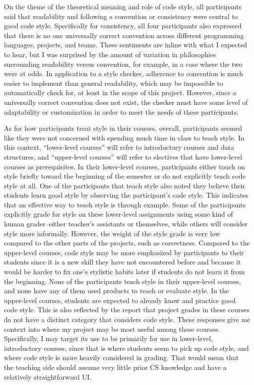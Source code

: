 \documentclass[10pt,twocolumn]{article}
\begin{document}
On the theme of the theoretical meaning and role of code style, all participants said that readability and following a convention or consistency were central to good code style. 
Specifically for consistency, all four participants also expressed that there is no one universally correct convention across different programming languages, projects, and teams.
These sentiments are inline with what I expected to hear, but I was surprised by the amount of variation in philosophies surrounding readability versus convention, for example, in a case where the two were at odds. 
In application to a style checker, adherence to convention is much easier to implement than general readability, which may be impossible to automatically check for, at least in the scope of this project. 
However, since a universally correct convention does not exist, the checker must have some level of adaptability or customization in order to meet the needs of these participants.

As for how participants treat style in their courses, overall, participants seemed like they were not concerned with spending much time in class to teach style. 
In this context, “lower-level courses” will refer to introductory courses and data structures, and “upper-level courses” will refer to electives that have lower-level courses as prerequisites. 
In their lower-level courses, participants either touch on style briefly toward the beginning of the semester or do not explicitly teach code style at all.
One of the participants that teach style also noted they believe their students learn good style by observing the participant's code style. 
This indicates that an effective way to teach style is through example.
Some of the participants explicitly grade for style on these lower-level assignments using some kind of human grader--either teacher's assistants or themselves, while others will consider style more informally. 
However, the weight of the style grade is very low compared to the other parts of the projects, such as correctness.
Compared to the upper-level courses, code style may be more emphasized by participants to their students since it is a new skill they have not encountered before and because it would be harder to fix one's stylistic habits later if students do not learn it from the beginning.
None of the participants teach style in their upper-level courses, and none have any of them used products to teach or evaluate style. 
In the upper-level courses, students are expected to already know and practice good code style. 
This is also reflected by the report that project grades in these courses do not have a distinct category that considers code style. 
These responses give me context into where my project may be most useful among these courses. 
Specifically, I may target its use to be primarily for use in lower-level, introductory courses, since that is where students seem to pick up code style, and where code style is more heavily considered in grading. 
That would mean that the teaching side should assume very little prior CS knowledge and have a relatively straightforward UI. 
\end{document}
